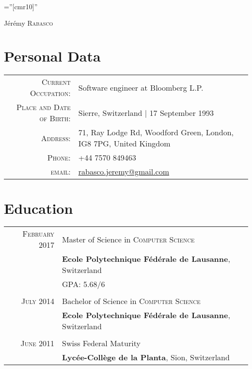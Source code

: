 \documentclass[a4paper,10pt]{article}
\begin{document}
\pagestyle{empty}
\font\fb=''[cmr10]''

\par{\centering
		{\Huge Jérémy \textsc{Rabasco}
	}\bigskip\par}

\section{Personal Data}

\begin{tabular}{rl}
	\textsc{Current Occupation:} & Software engineer at Bloomberg L.P.\\
	\textsc{Place and Date of Birth:} & Sierre, Switzerland | 17 September 1993 \\
	\textsc{Address:}   & 71, Ray Lodge Rd, Woodford Green, London, IG8 7PG, United Kingdom \\
	\textsc{Phone:}     & +44 7570 849463\\
	\textsc{email:}     & \href{mailto:rabasco.jeremy@gmail.com}{rabasco.jeremy@gmail.com}
\end{tabular}

\section{Education}
\begin{tabular}{rl}	
	\textsc{February 2017} & Master of Science in \textsc{Computer Science} \\
	& \textbf{Ecole Polytechnique Fédérale de Lausanne}, Switzerland\\
	&\normalsize \textsc{GPA}: 5.68/6\\\\
	\textsc{July} 2014 & Bachelor of Science in \textsc{Computer Science}\\
	& \textbf{Ecole Polytechnique Fédérale de Lausanne}, Switzerland\\\\
	\textsc{June 2011} & Swiss Federal Maturity\\
	&\textbf{Lycée-Collège de la Planta}, Sion, Switzerland
\end{tabular}

\end{document}

